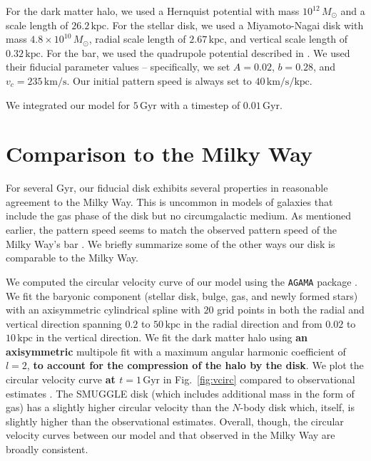 \documentclass[twocolumn,linenumbers,trackchanges]{aastex631}
\newcommand{\kms}{\ensuremath{\textrm{km}/\textrm{s}}}
\newcommand{\Nbody}{$N$-body}
\newcommand{\SMUGGLE}{SMUGGLE}
\newcommand{\Msun}{\ensuremath{M_{\odot}}}
\begin{document}
For the dark matter halo, we used a Hernquist potential
\citep{1990ApJ...356..359H} with mass $10^{12}\,\Msun$ and a scale length of
$26.2\,\textrm{kpc}$. For the stellar disk, we used a Miyamoto-Nagai disk
\citep{1975PASJ...27..533M} with mass $4.8\times10^{10}\,\Msun$, radial scale
length of $2.67\,\textrm{kpc}$, and vertical scale length of
$0.32\,\textrm{kpc}$. For the bar, we used the quadrupole potential described in
\citet{2022MNRAS.513..768C}. We used their fiducial parameter values --
specifically, we set $A=0.02$, $b=0.28$, and $v_c = 235\,\kms$. Our initial
pattern speed is always set to $40\,\kms/\textrm{kpc}$.

We integrated our model for $5\,\textrm{Gyr}$ with a timestep of
$0.01\,\textrm{Gyr}$.

\section{Comparison to the Milky Way}
\label{app:milkyway}
For several Gyr, our fiducial disk exhibits several properties in reasonable
agreement to the Milky Way. This is uncommon in models of galaxies that include
the gas phase of the disk but no circumgalactic medium. As mentioned earlier,
the pattern speed seems to match the observed pattern speed of the Milky Way's
bar \citep{2019MNRAS.490.4740B}. We briefly summarize some of the other ways our
disk is comparable to the Milky Way.

We computed the circular velocity curve of our model using the \texttt{AGAMA}
package \citep{2019MNRAS.482.1525V}. We fit the baryonic component (stellar
disk, bulge, gas, and newly formed stars) with an axisymmetric cylindrical
spline with $20$ grid points in both the radial and vertical direction spanning
$0.2$ to $50\,\textrm{kpc}$ in the radial direction and from $0.02$ to
$10\,\textrm{kpc}$ in the vertical direction. We fit the dark matter halo using
{\bf an axisymmetric} multipole fit with a maximum angular harmonic coefficient
of $l=2$, {\bf to account for the compression of the halo by the disk}. We plot
the circular velocity curve {\bf at $t=1\,\textrm{Gyr}$} in Fig.~\ref{fig:vcirc}
compared to observational estimates \citep{2019ApJ...871..120E}. The \SMUGGLE{}
disk (which includes additional mass in the form of gas) has a slightly higher
circular velocity than the \Nbody{} disk which, itself, is slightly higher than
the observational estimates. Overall, though, the circular velocity curves
between our model and that observed in the Milky Way are broadly consistent.
\end{document}

